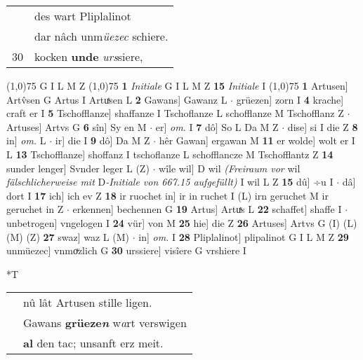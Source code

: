 \documentclass[8pt,a4paper,notitlepage]{article}
\begin{document}
\begin{table}[ht]
\begin{minipage}[t]{0.5\linewidth}
\begin{tabular}{rl}
 & des wart Pliplalinot\\ 
 & dar nâch unm\textit{üezec} schiere.\\ 
30 & kocken \textbf{unde} \textit{urs}siere,\\ 
\end{tabular}
\scriptsize
\line(1,0){75} \newline
G I L M Z \newline
\line(1,0){75} \newline
\textbf{1} \textit{Initiale} G I L M Z  \textbf{15} \textit{Initiale} I  \newline
\line(1,0){75} \newline
\textbf{1} Artusen] Artv̂sen G Artus I Artuͯsen L \textbf{2} Gawans] Gawanz L  $\cdot$ grüezen] zorn I \textbf{4} krache] craft er I \textbf{5} Tschofflanze] shaffanze I Tschoflanze L schofflanze M Tschofflanz Z  $\cdot$ Artuses] Artvs G \textbf{6} sîn] Sy en M  $\cdot$ er] \textit{om.} I \textbf{7} dô] So L Da M Z  $\cdot$ dise] si I die Z \textbf{8} in] \textit{om.} L  $\cdot$ ir] die I \textbf{9} dô] Da M Z  $\cdot$ hêr Gawan] ergawan M \textbf{11} er wolde] wolt er I L \textbf{13} Tschofflanze] shoffanz I tschoflanze L schofflancze M Tschofflantz Z \textbf{14} sunder lenger] Svnder leger L (Z)  $\cdot$ wîle wil] D wil \textit{(Freiraum vor} wil \textit{fälschlicherweise mit} D\textit{-Initiale von 667.15 aufgefüllt)} I wil L Z \textbf{15} dû] ÷u I  $\cdot$ dâ] dort I \textbf{17} ich] ich ev Z \textbf{18} ir ruochet in] ir in ruchet I (L) irn geruchet M ir geruchet in Z  $\cdot$ erkennen] bechennen G \textbf{19} Artus] Artuͯs L \textbf{22} schaffet] shaffe I  $\cdot$ unbetrogen] vngelogen I \textbf{24} vür] von M \textbf{25} hie] die Z \textbf{26} Artuses] Artvs G (I) (L) (M) (Z) \textbf{27} swaz] waz L (M)  $\cdot$ in] \textit{om.} I \textbf{28} Pliplalinot] plipalinot G I L M Z \textbf{29} unmüezec] vnmoͮzlich G \textbf{30} urssiere] visîere G vrshiere I \newline
\end{minipage}
\hspace{0.5cm}
\begin{minipage}[t]{0.5\linewidth}
\small
\begin{center}*T
\end{center}
\begin{tabular}{rl}
 & nû lât Artusen stille ligen.\\ 
 & Gawans \textbf{grüeze\textit{n}} w\textit{a}rt verswigen\\ 
 & \textbf{al} den tac; unsanft erz meit.\\ 

\end{tabular}
\end{minipage}
\end{table}
\end{document}
